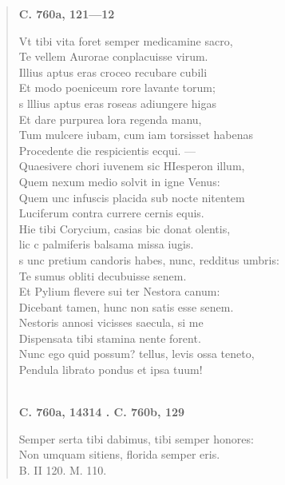 \documentclass[11pt, a4paper]{report}
\begin{document}
\begin{verse}
    \begin{center} \textbf{C. 760a, 121—12} \end{center} \marginpar{[04]}  \marginpar{[241]} Vt tibi vita foret semper medicamine sacro, \\ Te vellem Aurorae conplacuisse virum. \\ Illius aptus eras croceo recubare cubili \\ Et modo poeniceum rore lavante torum; \\ s lllius aptus eras roseas adiungere higas \\ Et dare purpurea lora regenda manu, \\ Tum mulcere iubam, cum iam torsisset habenas \\ Procedente die respicientis ecqui. — \\ Quaesivere chori iuvenem sic HIesperon illum, \\ Quem nexum medio solvit in igne Venus: \\ Quem unc infuscis placida sub nocte nitentem \\ Luciferum contra currere cernis equis. \\ Hie tibi Corycium, casias bic donat olentis, \\ lic c palmiferis balsama missa iugis. \\ s unc pretium candoris habes, nunc, redditus umbris: \\ Te sumus obliti decubuisse senem. \\ Et Pylium flevere sui ter Nestora canum: \\ Dicebant tamen, hunc non satis esse senem. \\ Nestoris annosi vicisses saecula, si me \\ Dispensata tibi stamina nente forent. \\ Nunc ego quid possum? tellus, levis ossa teneto, \\ Pendula librato pondus et ipsa tuum! \\ 
        ﻿\pagebreak 
    \begin{center} \textbf{C. 760a, 14314 . C. 760b, 129} \end{center} \marginpar{[242]} Semper serta tibi dabimus, tibi semper honores: \\ Non umquam sitiens, florida semper eris. \\ B. II 120. M. 110. \\ 
      \end{verse}
  
\end{document}
